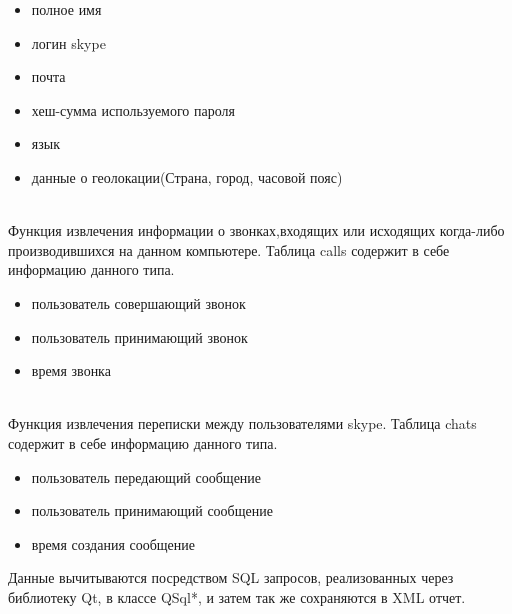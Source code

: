 \begin{itemize}
\item полное имя
\item логин skype
\item почта
\item хеш-сумма используемого пароля
\item язык
\item данные о геолокации(Страна, город, часовой пояс)
\end{itemize}

\\Функция извлечения информации о звонках,входящих или исходящих когда-либо производившихся на данном компьютере. Таблица calls содержит в себе информацию данного типа.

\begin{itemize}
\item пользователь совершающий звонок
\item пользователь принимающий звонок
\item время звонка
\end{itemize}

\\Функция извлечения переписки между пользователями skype. Таблица chats содержит в себе информацию данного типа.

\begin{itemize}
\item пользователь передающий сообщение 
\item пользователь принимающий сообщение 
\item время создания сообщение 
\end{itemize}

Данные вычитываются посредством SQL запросов, реализованных через библиотеку Qt, в классе QSql*, и затем так же сохраняются в XML отчет.

